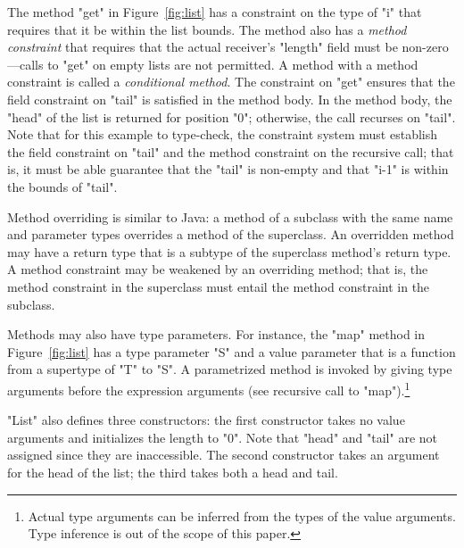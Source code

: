 The method \xcd"get" in Figure~\ref{fig:list}
has a constraint on the type of \xcd"i" that requires
that it be within the list bounds.
The method also has a \emph{method constraint} that
requires that the actual
receiver's
\xcd"length" field must be non-zero---calls to \xcd"get" on empty lists are not
permitted.
A method with a method constraint is called a \emph{conditional method}.
The constraint on \xcd"get" ensures that the field constraint on
\xcd"tail" is satisfied in the method body.
In the method body, the \xcd"head" of the list is returned for
position \xcd"0"; otherwise, the call recurses on \xcd"tail".
Note that for this example to type-check, the constraint system
must establish the field constraint on \xcd"tail"
and the method constraint on the recursive call;
that is, it must be able
guarantee that the \xcd"tail" is non-empty and that
\xcd"i-1" is within the bounds of \xcd"tail".

Method overriding is similar to Java: a method of a subclass
with the same name and parameter types overrides a method of the
superclass.  An overridden method may have a return type that is
a subtype of the superclass method's return type.
A method constraint may be weakened by an overriding
method; that is, the method constraint in the superclass must entail the  
method constraint in the subclass.

Methods may also have type parameters.  
For instance, the \xcd"map" method in Figure~\ref{fig:list} 
has a type parameter \xcd"S" and a value parameter that is a
function from a supertype of \xcd"T" to \xcd"S".
A parametrized method is invoked by giving type arguments before the
expression arguments (see recursive call to
\xcd"map").\footnote{Actual type arguments can be inferred from the types
of the value arguments. Type inference is out of the scope of this paper.}

\xcd"List" also defines three constructors: the first
constructor takes no value arguments and initializes
the length to \xcd"0".  Note that \xcd"head" and \xcd"tail" are
not assigned since they are inaccessible.
The second constructor takes an argument for the head of the
list; the third takes both a head and tail.

